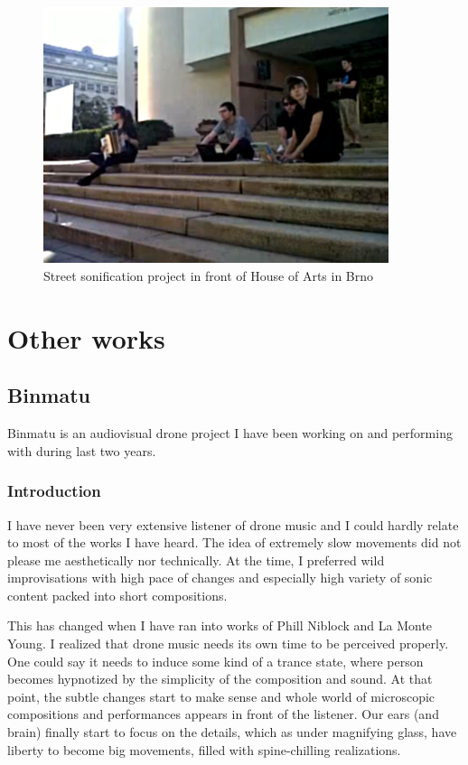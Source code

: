 \documentclass[12pt,a4paper,oneside]{report}
\begin{document}
\begin{figure}  
  \centering
    \includegraphics[width=0.9\textwidth]{img/workshop}
	\caption{Street sonification project in front of House of Arts in Brno}
	\label{fig:workshop}
\end{figure}


\chapter{Other works} 

\section{Binmatu} Binmatu is an audiovisual drone project I have been working on and performing with during last two years.

\subsection{Introduction}

I have never been very extensive listener of drone music and I could hardly relate to most of the works I have heard. The idea of extremely slow movements did not please me aesthetically nor technically. At the time, I preferred wild improvisations with high pace of changes and especially high variety of sonic content packed into short compositions.

This has changed when I have ran into works of Phill Niblock and La Monte Young. I realized that drone music needs its own time to be perceived properly. One could say it needs to induce some kind of a trance state, where person becomes hypnotized by the simplicity of the composition and sound. At that point, the subtle changes start to make sense and whole world of microscopic compositions and performances appears in front of the listener. Our ears (and brain) finally start to focus on the details, which as under magnifying glass, have liberty to become big movements, filled with spine-chilling realizations.
\end{document}
